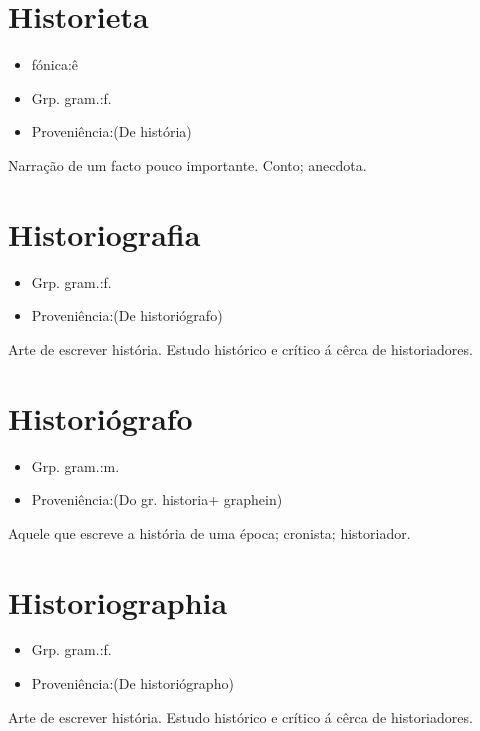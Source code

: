 \documentclass{article}
\begin{document}
\section{Historieta}
\begin{itemize}
\item {fónica:ê}
\end{itemize}
\begin{itemize}
\item {Grp. gram.:f.}
\end{itemize}
\begin{itemize}
\item {Proveniência:(De \textunderscore história\textunderscore )}
\end{itemize}
Narração de um facto pouco importante.
Conto; anecdota.
\section{Historiografia}
\begin{itemize}
\item {Grp. gram.:f.}
\end{itemize}
\begin{itemize}
\item {Proveniência:(De \textunderscore historiógrafo\textunderscore )}
\end{itemize}
Arte de escrever história.
Estudo histórico e crítico á cêrca de historiadores.
\section{Historiógrafo}
\begin{itemize}
\item {Grp. gram.:m.}
\end{itemize}
\begin{itemize}
\item {Proveniência:(Do gr. \textunderscore historia\textunderscore  + \textunderscore graphein\textunderscore )}
\end{itemize}
Aquele que escreve a história de uma época; cronista; historiador.
\section{Historiographia}
\begin{itemize}
\item {Grp. gram.:f.}
\end{itemize}
\begin{itemize}
\item {Proveniência:(De \textunderscore historiógrapho\textunderscore )}
\end{itemize}
Arte de escrever história.
Estudo histórico e crítico á cêrca de historiadores.
\end{document}
